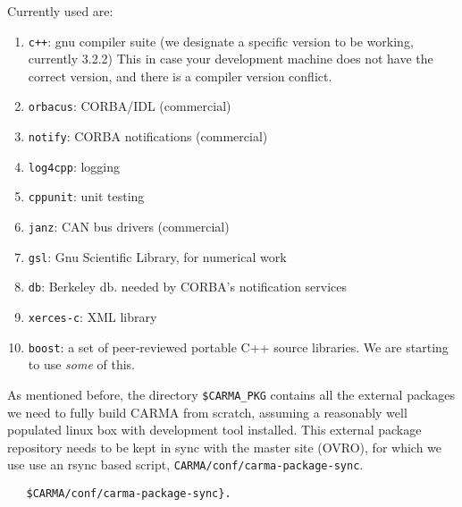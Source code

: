 \documentclass{article}
\begin{document}
Currently used are:

\begin{enumerate}

\item
{\tt c++}: gnu compiler suite (we designate a specific version to be working, currently 3.2.2)
This in case your development machine does not have the correct version, and there
is a compiler version conflict.
\item
{\tt orbacus}: CORBA/IDL (commercial)


\item
{\tt notify}: CORBA notifications (commercial)

\item
{\tt log4cpp}: logging

\item
{\tt cppunit}: unit testing

\item
{\tt janz}: CAN bus drivers (commercial)

\item
{\tt gsl}: Gnu Scientific Library, for numerical work 

\item
{\tt db}: Berkeley db. needed by CORBA's notification services

\item
{\tt xerces-c}: XML library

\item
{\tt boost}: a set of peer-reviewed portable C++ source libraries. We 
are starting to use {\it some} of this.



\end{enumerate}

As mentioned before, the directory {\tt \$CARMA\_PKG}
contains all the external packages we need to fully build CARMA
from scratch, assuming a reasonably well populated linux box
with development tool installed.
This external package repository needs to be kept in sync with the
master site (OVRO), for which we use
use an rsync based script, {\tt CARMA/conf/carma-package-sync}.


\footnotesize\begin{verbatim}
   $CARMA/conf/carma-package-sync}.
\end{verbatim}\normalsize    %
\end{document}
